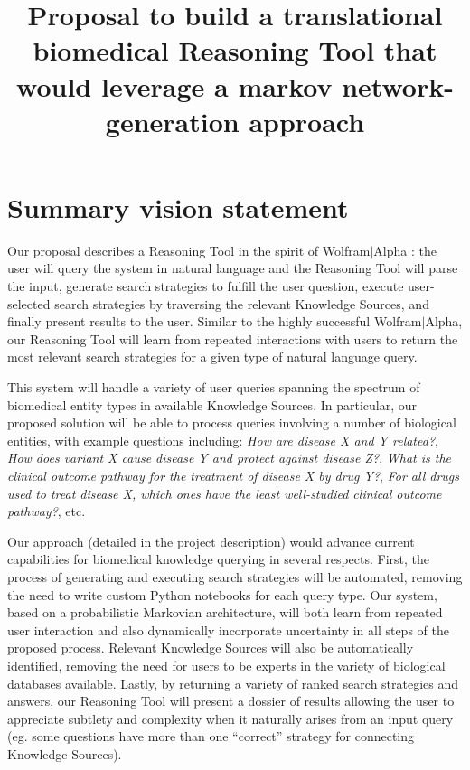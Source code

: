 \documentclass[11pt,notitlepage]{article}
\begin{document}
\title{Proposal to build a translational biomedical Reasoning Tool that
  would leverage a markov network-generation approach}
\date{}
\author{}
\maketitle
\vspace{-0.5in}
\thispagestyle{plain}

\section*{Summary vision statement}
\setlength{\parskip}{4pt} Our proposal describes a Reasoning Tool in the
spirit of Wolfram$|$Alpha \cite{Wolframalpha}: the user will query the system in
natural language and the Reasoning Tool will parse the input, generate search
strategies to fulfill the user question, execute user-selected search strategies
by traversing the relevant Knowledge Sources, and finally present results to the
user. Similar to the highly successful Wolfram$|$Alpha, our Reasoning Tool
will learn from repeated interactions with users to return the most relevant
search strategies for a given type of natural language query.

This system will handle a variety of user queries spanning the spectrum of
biomedical entity types in available Knowledge Sources. In
particular, our proposed solution will be able to process queries involving a
number of biological entities, with example questions including: \textit{How are
  disease X and Y related?}, \textit{How does variant X cause disease Y and
  protect against disease Z?}, \textit{What is the clinical outcome pathway for
  the treatment of disease X by drug Y?}, \textit{For all drugs used to treat
  disease X, which ones have the least well-studied clinical outcome pathway?},
etc.

Our approach (detailed in the project description) would advance current
capabilities for biomedical knowledge querying in several respects. First, the
process of generating and executing search strategies will be automated,
removing the need to write custom Python notebooks for each query type. Our
system, based on a probabilistic Markovian architecture, will both learn from
repeated user interaction and also dynamically incorporate uncertainty in all
steps of the proposed process. Relevant Knowledge Sources will also be
automatically identified, removing the need for users to be experts in the
variety of biological databases available. Lastly, by returning a variety of
ranked search strategies and answers, our Reasoning Tool will present a
dossier of results allowing the user to appreciate subtlety and complexity when
it naturally arises from an input query (eg. some questions have more than one
``correct'' strategy for connecting Knowledge Sources).
\end{document}

